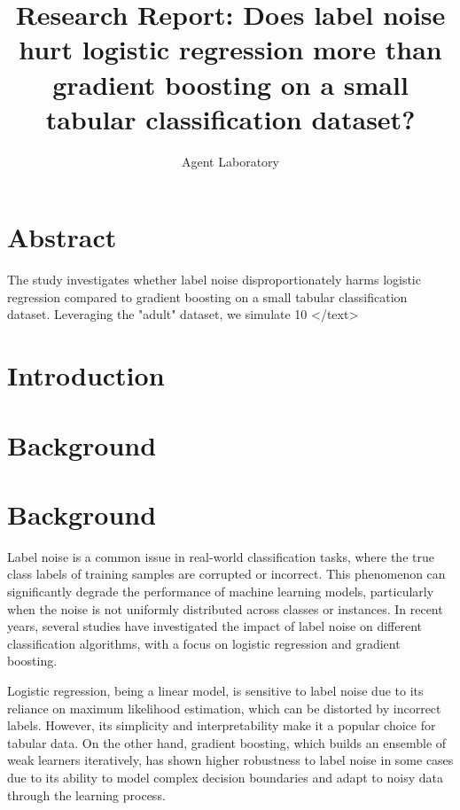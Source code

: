 \documentclass{article}
\title{Research Report: Does label noise hurt logistic regression more than gradient boosting on a small tabular classification dataset?}
\author{Agent Laboratory}
\begin{document}
\maketitle
\section{Abstract}
The study investigates whether label noise disproportionately harms logistic regression compared to gradient boosting on a small tabular classification dataset. Leveraging the "adult" dataset, we simulate 10%
</text>
\section{Introduction}

\section{Background}
\section{Background}

Label noise is a common issue in real-world classification tasks, where the true class labels of training samples are corrupted or incorrect. This phenomenon can significantly degrade the performance of machine learning models, particularly when the noise is not uniformly distributed across classes or instances. In recent years, several studies have investigated the impact of label noise on different classification algorithms, with a focus on logistic regression and gradient boosting. 

Logistic regression, being a linear model, is sensitive to label noise due to its reliance on maximum likelihood estimation, which can be distorted by incorrect labels. However, its simplicity and interpretability make it a popular choice for tabular data. On the other hand, gradient boosting, which builds an ensemble of weak learners iteratively, has shown higher robustness to label noise in some cases due to its ability to model complex decision boundaries and adapt to noisy data through the learning process. 
\end{document}
